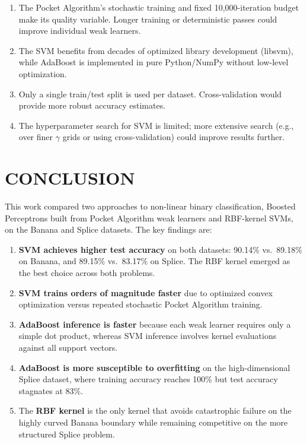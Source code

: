 \documentclass{acm_proc_article-sp}
\begin{document}
\begin{enumerate}
\item The Pocket Algorithm's stochastic training and fixed 10,000-iteration budget make its quality variable. Longer training or deterministic passes could improve individual weak learners.
\item The SVM benefits from decades of optimized library development (libsvm), while AdaBoost is implemented in pure Python/NumPy without low-level optimization.
\item Only a single train/test split is used per dataset. Cross-validation would provide more robust accuracy estimates.
\item The hyperparameter search for SVM is limited; more extensive search (e.g., over finer $\gamma$ grids or using cross-validation) could improve results further.
\end{enumerate}

\section{CONCLUSION}

This work compared two approaches to non-linear binary classification, Boosted Perceptrons built from Pocket Algorithm weak learners and RBF-kernel SVMs, on the Banana and Splice datasets. The key findings are:

\begin{enumerate}
\item \textbf{SVM achieves higher test accuracy} on both datasets: 90.14\% vs.\ 89.18\% on Banana, and 89.15\% vs.\ 83.17\% on Splice. The RBF kernel emerged as the best choice across both problems.
\item \textbf{SVM trains orders of magnitude faster} due to optimized convex optimization versus repeated stochastic Pocket Algorithm training.
\item \textbf{AdaBoost inference is faster} because each weak learner requires only a simple dot product, whereas SVM inference involves kernel evaluations against all support vectors.
\item \textbf{AdaBoost is more susceptible to overfitting} on the high-dimensional Splice dataset, where training accuracy reaches 100\% but test accuracy stagnates at 83\%.
\item The \textbf{RBF kernel} is the only kernel that avoids catastrophic failure on the highly curved Banana boundary while remaining competitive on the more structured Splice problem.
\end{enumerate}
\end{document}
